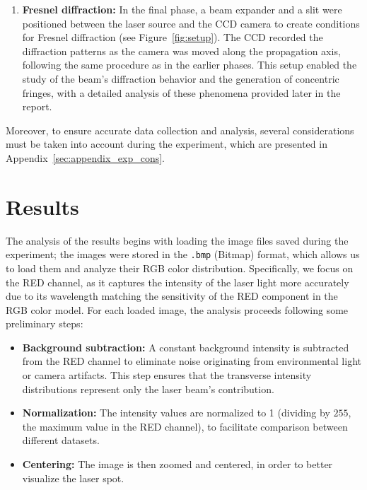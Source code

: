 \documentclass[prl,twocolumn]{revtex4-1}
\begin{document}
\begin{enumerate}
  \item \textbf{Fresnel diffraction:}  
  In the final phase, a beam expander and a slit were positioned between the laser source and the CCD camera to create conditions for Fresnel diffraction (see Figure~\ref{fig:setup}). The CCD recorded the diffraction patterns as the camera was moved along the propagation axis, following the same procedure as in the earlier phases. This setup enabled the study of the beam's diffraction behavior and the generation of concentric fringes, with a detailed analysis of these phenomena provided later in the report.
\end{enumerate}

Moreover, to ensure accurate data collection and analysis, several considerations must be taken into account during the experiment, which are presented in Appendix~\ref{sec:appendix_exp_cons}.

\section{Results}
The analysis of the results begins with loading the image files saved during the experiment; the images were stored in the \texttt{.bmp} (Bitmap) format, which allows us to load them and analyze their RGB color distribution. Specifically, we focus on the RED channel, as it captures the intensity of the laser light more accurately due to its wavelength matching the sensitivity of the RED component in the RGB color model. For each loaded image, the analysis proceeds following some preliminary steps: 
\begin{itemize}
    \item \textbf{Background subtraction:} A constant background intensity is subtracted from the RED channel to eliminate noise originating from environmental light or camera artifacts. This step ensures that the transverse intensity distributions represent only the laser beam's contribution.
    \item \textbf{Normalization:} The intensity values are normalized to 1 (dividing by $255$, the maximum value in the RED channel), to facilitate comparison between different datasets.
    \item \textbf{Centering:} The image is then zoomed and centered, in order to better visualize the laser spot.
\end{itemize}
\end{document}
